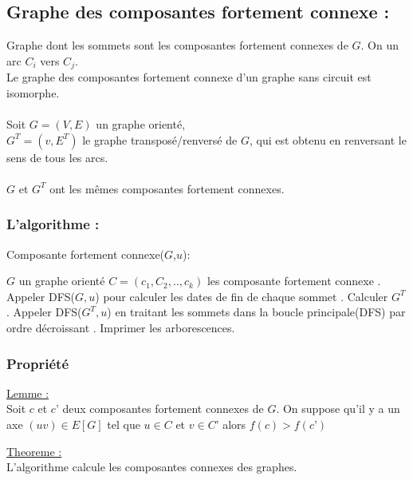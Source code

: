 \documentclass{article}
\begin{document}
\subsection{Graphe des composantes fortement connexe : }
Graphe dont les sommets sont les composantes fortement connexes de $G$. On un arc $C_{i}$ vers $C_{j}$. \\
Le graphe des composantes fortement connexe d’un  graphe sans circuit est isomorphe. \\
\\
Soit $G=(V,E)$ un graphe orienté, \\ 
$G^{T}=(v,E^T)$ le graphe transposé/renversé de $G$, qui est obtenu en renversant le sens de tous les arcs. \\
\\
$G$ et $G^{T}$ ont les mêmes composantes fortement connexes. 
\subsubsection{L'algorithme : }
\begin{algorithm}
\caption{Composante fortement connexe($G$,$u$):}
\begin{algorithmic}
\REQUIRE $G$ un graphe orienté
\ENSURE $C=(c_{1},C_{2},..,c_{k})$ les composante fortement connexe
. Appeler DFS($G,u$) pour calculer les dates de fin de chaque sommet
. Calculer $G^{T}$
. Appeler DFS($G^{T},u$) en traitant les sommets dans la boucle principale(DFS) par ordre décroissant
. Imprimer les arborescences.
\end{algorithmic}
\end{algorithm}
\subsubsection{Propriété}
\underline{Lemme : }\\
Soit $c$ et $c’$ deux composantes fortement connexes de $G$. On suppose qu’il y a un axe $(uv) \in E[G]$ tel que $u \in C$ et $v \in C’$ alors $f(c) > f(c’)$

\underline{Theoreme : }\\
L’algorithme calcule les composantes connexes des graphes. 
\end{document}
